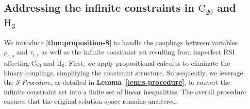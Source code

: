 \documentclass[10pt,journal,compsoc]{IEEEtran}
\theoremstyle{myremark}
\theoremstyle{myexample}
\begin{document}
\subsection{Addressing the infinite constraints in $ \mathrm{C}_{20} $ and $ \mathrm{H}_{3} $}
 
We introduce \textbf{\cref{thm:proposition-8}} to handle the couplings between variables $ \rho_{c,s} $ and $ \tau_{t,s} $ as well as the infinite constraint set resulting from imperfect \gls{RSI} affecting $ \mathrm{C}_{20} $ and $ \mathrm{H}_{3} $. First, we apply propositional calculus to eliminate the binary couplings, simplifying the constraint structure. Subsequently, we leverage the \emph{S-Procedure}, as detailed in \textbf{Lemma~\ref{lem:s-procedure}}, to convert the infinite constraint set into a finite set of linear inequalities. The overall procedure ensures that the original solution space remains unaltered.
\end{document}
